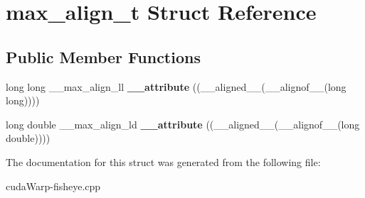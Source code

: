 \hypertarget{structmax__align__t}{}\section{max\+\_\+align\+\_\+t Struct Reference}
\label{structmax__align__t}
\subsection*{Public Member Functions}
\begin{DoxyCompactItemize}
\item 
long long \+\_\+\+\_\+max\+\_\+align\+\_\+ll {\bfseries \+\_\+\+\_\+attribute} ((\+\_\+\+\_\+aligned\+\_\+\+\_\+(\+\_\+\+\_\+alignof\+\_\+\+\_\+(long long))))\hypertarget{structmax__align__t_a1410dd9a193d05746467f1d068144e43}{}\label{structmax__align__t_a1410dd9a193d05746467f1d068144e43}

\item 
long double \+\_\+\+\_\+max\+\_\+align\+\_\+ld {\bfseries \+\_\+\+\_\+attribute} ((\+\_\+\+\_\+aligned\+\_\+\+\_\+(\+\_\+\+\_\+alignof\+\_\+\+\_\+(long double))))\hypertarget{structmax__align__t_aed5b379f25a6fe3ad49125304738dcf7}{}\label{structmax__align__t_aed5b379f25a6fe3ad49125304738dcf7}

\end{DoxyCompactItemize}


The documentation for this struct was generated from the following file\+:\begin{DoxyCompactItemize}
\item 
cuda\+Warp-\/fisheye.\+cpp\end{DoxyCompactItemize}
